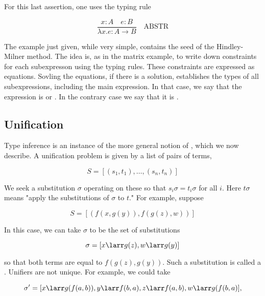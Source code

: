 For this last assertion, one uses the typing rule

\begin{equation}
\frac{x: A\quad e:B}{\lambda x.e : A \to B} \quad \text{ABSTR}
\end{equation}

The example just given, while very simple, contains the seed of the Hindley-Milner method.  The idea is, as in the matrix example, to write down constraints for each subexpresson using the typing rules.  These constraints are expressed as equations.  Sovling the equations, if there is a solution, establishes the types of all subexpressions, including the main expression.  In that case, we say that the expression is  or .  In the contrary case we say that it is .

\subsection{Unification}

Type inference is an instance of the more general notion of , which we now describe.  A unification problem is given by a list of pairs of terms,

\begin{equation}
S =  [(s_1, t_1), \ldots, (s_n, t_n)]
\end{equation}

We seek a substitution $\sigma$ operating on these so that $ s_i  \sigma= t_i \sigma$ for all $i$. Here $t\sigma$ means "apply the substitutions of $\sigma$ to $t$." For example, suppose 

\begin{equation}
S = [ ( f(x,g(y)), f(g(z), w) )]
\end{equation}

In this case, we can take $\sigma$ to be the set of substitutions

\begin{equation}
\sigma = [x \larr g(z), w \larr g(y)]
\end{equation}

so that both terms are equal to $f(g(z), g(y)) $. Such a substitution is called a .  Unifiers are not unique. For example, we could take 

\begin{equation}
\sigma' = [x \larr g(f(a,b)), y \larr f(b,a), z \larr f(a,b), w \larr g(f(b,a)],
\end{equation}

